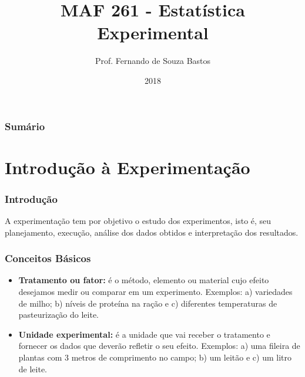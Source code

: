 \documentclass[14pt,aspectratio=1610]{beamer}
\title{MAF 261 - Estatística Experimental}
\author{Prof. Fernando de Souza Bastos}
\institute{Instituto de Ciências Exatas e Tecnológicas\texorpdfstring{\\ Universidade Federal de Viçosa}{}\texorpdfstring{\\ Campus UFV - Florestal}{}}
\date{2018}
\begin{document}


\frame{\titlepage}

\begin{frame}{}
\frametitle{\bf Sumário}
\tableofcontents
\end{frame}

\section{Introdução à Experimentação}
\begin{frame}{}
\frametitle{Introdução}
\begin{block}{}
\justifying
A experimentação tem por objetivo o estudo dos experimentos, isto é, seu planejamento, execução, análise dos dados obtidos e interpretação dos resultados.
\end{block}
\end{frame}

\begin{frame}{}
\frametitle{Conceitos Básicos}
\begin{block}{}
\justifying
\begin{itemize}
\item {\bf Tratamento ou fator:} é o método, elemento ou material cujo efeito desejamos medir ou comparar em um experimento. Exemplos: a) variedades de milho; b) níveis de proteína na ração e c) diferentes temperaturas de pasteurização do leite.
\item {\bf Unidade experimental:} é a unidade que vai receber o tratamento e fornecer os dados que deverão refletir o seu efeito. Exemplos: a) uma fileira de plantas com 3
metros de comprimento no campo; b) um leitão e c) um litro de leite.
\end{itemize}
\end{block}
\end{frame}

\begin{frame}{}
\frametitle{}
\begin{block}{}
\justifying


\end{block}
\end{frame}

\begin{frame}{}
\frametitle{}
\begin{block}{}
\justifying


\end{block}
\end{frame}

\begin{frame}{}
\frametitle{}
\begin{block}{}
\justifying


\end{block}
\end{frame}
\end{document}
